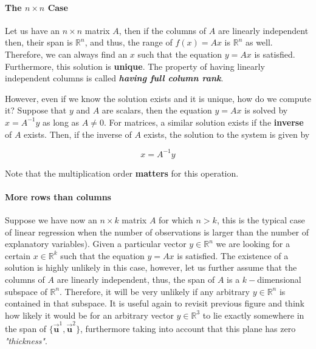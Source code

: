 \documentclass[a4paper,11pt]{article}
\theoremstyle{definition}
\theoremstyle{plain}
\begin{document}
\paragraph{\texorpdfstring{The \(n\times n\)
Case}{The n\textbackslash{}times n Case}}\label{the-ntimes-n-case}

Let us have an \(n\times n\) matrix \(A\), then if the columns of \(A\)
are linearly independent then, their span is \(\mathbb{R}^n\), and thus,
the range of \(f(x) = Ax\) is \(\mathbb{R}^n\) as well. Therefore, we
can always find an \(x\) such that the equation \(y = Ax\) is satisfied.
Furthermore, this solution is \textbf{unique}. The property of having
linearly independent columns is called \textbf{\emph{having full column
rank}}.

However, even if we know the solution exists and it is unique, how do we
compute it? Suppose that \(y\) and \(A\) are scalars, then the equation
\(y = Ax\) is solved by \(x = A^{-1}y\) as long as \(A\neq 0\). For
matrices, a similar solution exists if the \textbf{inverse} of \(A\)
exists. Then, if the inverse of \(A\) exists, the solution to the system
is given by

\[
x = A^{-1}y
\]

Note that the multiplication order \textbf{matters} for this operation.

    \paragraph{More rows than columns}\label{more-rows-than-columns}

Suppose we have now an \(n\times k\) matrix \(A\) for which \(n > k\),
this is the typical case of linear regression when the number of
observations is larger than the number of explanatory variables). Given
a particular vector \(y\in\mathbb{R}^n\) we are looking for a certain
\(x\in\mathbb{R}^k\) such that the equation \(y = Ax\) is satisfied. The
existence of a solution is highly unlikely in this case, however, let us
further assume that the columns of \(A\) are linearly independent, thus,
the span of \(A\) is a \(k-\)dimensional subspace of \(\mathbb{R}^n\).
Therefore, it will be very unlikely if any arbitrary
\(y\in\mathbb{R}^n\) is contained in that subspace. It is useful again
to revisit previous figure and think how likely it would be for an
arbitrary vector \(y\in\mathbb{R}^3\) to lie exactly somewhere in the
span of \(\{\vec{\mathbf{u}}^1,\vec{\mathbf{u}}^2\}\), furthermore
taking into account that this plane has zero \emph{"thickness"}.
\end{document}
